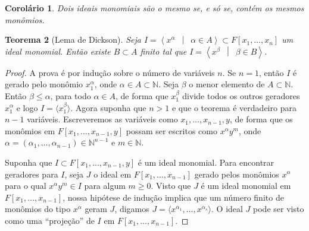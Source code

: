 \documentclass[12pt,a4paper]{report}
\newcommand{\N}{\mathbb{N}}
\newcommand{\suchthat}{\enspace\middle|\enspace}
\newtheorem{theorem}{Teorema}
\newtheorem{corollary}[theorem]{Corolário}
\numberwithin{theorem}{chapter}
\begin{document}
\begin{corollary}\label{corol_identidade_de_ideal}
  Dois ideais monomiais são o mesmo se, e só se, contém os mesmos
  monômios.
\end{corollary}

\begin{theorem}[Lema de Dickson]\label{lema_de_dickson}
  Seja \(I = \left\langle x^\alpha \suchthat \alpha \in A\right\rangle
  \subset F[x_1,\ldots,x_n]\) um ideal monomial.  Então existe \(B
  \subset A\) finito tal que \(I = \left\langle x^\beta \suchthat
    \beta \in B\right\rangle\).
\end{theorem}

\begin{proof}
  A prova é por indução sobre o número de variáveis \(n\).  Se \(n =
  1\), então \(I\) é gerado pelo monômio \(x_1^\alpha\), onde \(\alpha
  \in A \subset \N\).  Seja \(\beta\) o menor elemento de \(A \subset
  \N\).  Então \(\beta \leq \alpha\), para todo \(\alpha \in A\), de
  forma que \(x_1^\beta\) divide todos os outros geradores
  \(x_1^\alpha\) e logo \(I = \langle x_1^\beta \rangle\).  Agora
  suponha que \(n > 1\) e que o teorema é verdadeiro para \(n - 1\)
  variáveis.  Escreveremos as variáveis como \(x_1,\ldots,x_{n-1},y\),
  de forma que os monômios em \(F[x_1,\ldots,x_{n-1},y]\) possam ser
  escritos como \(x^\alpha y^m\), onde \(\alpha =
  (\alpha_1,\ldots,\alpha_{n-1}) \in \N^{n-1}\) e \(m \in \N\).

  Suponha que \(I \subset F[x_1,\ldots,x_{n-1},y]\) é um ideal
  monomial.  Para encontrar geradores para \(I\), seja \(J\) o ideal
  em \(F[x_1,\ldots,x_{n-1}]\) gerado pelos monômios \(x^\alpha\) para
  o qual \(x^\alpha y^m \in I\) para algum \(m \geq 0\).  Visto que
  \(J\) é um ideal monomial em \(F[x_1,\ldots,x_{n-1}]\), nossa
  hipótese de indução implica que um número finito de monômios do tipo
  \(x^\alpha\) geram \(J\), digamos \(J = \langle
  x^{\alpha_1},\ldots,x^{\alpha_s}\rangle\).  O ideal \(J\) pode ser visto
  como uma ``projeção'' de \(I\) em \(F[x_1,\ldots,x_{n-1}]\).


\end{proof}
\end{document}
